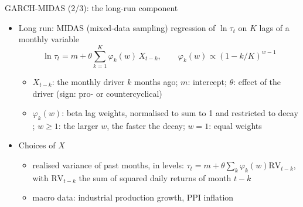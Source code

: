 \begin{frame}{GARCH-MIDAS (2/3): the long-run component}
\itemsize{\small}
\begin{itemize}
    \item Long run: MIDAS (mixed-data sampling) regression of $\ln\tau_t$ on $K$ lags of a monthly variable
    \[ \ln\tau_t = m + \theta\sum_{k=1}^K\varphi_k(w)\,X_{t-k}, \qquad \varphi_k(w) \propto (1 - k/K)^{w - 1} \]
    \begin{itemize}
        \item $X_{t-k}$: the monthly driver $k$ months ago; $m$: intercept; $\theta$: effect of the driver (sign: pro- or countercyclical)
        \item $\varphi_k(w)$: beta lag weights, normalised to sum to 1 and restricted to decay ; $w \ge 1$: the larger $w$, the faster the decay; $w = 1$: equal weights
    \end{itemize}
    \item Choices of $X$
    \begin{itemize}
        \item realised variance of past months, in levels: $\tau_t = m + \theta\sum_k\varphi_k(w)\mathrm{RV}_{t-k}$, with $\mathrm{RV}_{t-k}$ the sum of squared daily returns of month $t-k$
        \item macro data: industrial production growth, PPI inflation
    \end{itemize}
\end{itemize}
\end{frame}

